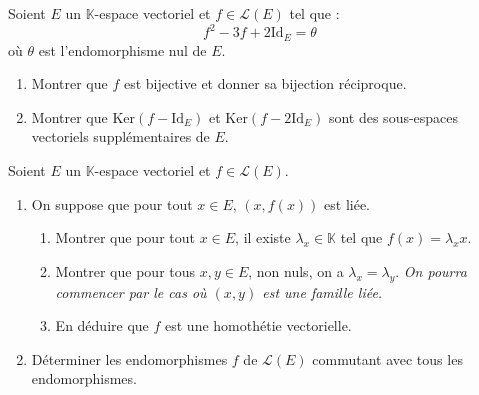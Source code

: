 \documentclass[a4paper,10pt]{report}
\begin{document}
\begin{Exercice}{} Soient $E$ un $\mathbb{K}$-espace vectoriel et $f \in \mathcal{L}(E)$ tel que :
    \[
    f^2 - 3f + 2 \textrm{Id}_E = \theta
    \]
où $\theta$ est l'endomorphisme nul de $E$.
    \begin{enumerate}
      \item Montrer que $f$ est bijective et donner sa bijection réciproque.
      \item Montrer que $\textrm{Ker}(f - \textrm{Id}_E)$ et $\textrm{Ker}(f - 2\textrm{Id}_E)$ sont des sous-espaces vectoriels supplémentaires de $E$.
    \end{enumerate}
\end{Exercice}



\begin{Exercice}{} Soient $E$ un $\mathbb{K}$-espace vectoriel et $f \in \mathcal{L}(E)$.

\begin{enumerate}
\item On suppose que pour tout $x \in E$, $(x, f(x))$ est liée.
\begin{enumerate}
\item Montrer que pour tout $x \in E$, il existe $\lambda_x \in \mathbb{K}$ tel que $f(x)= \lambda_x x$.
\item Montrer que pour tous $x,y \in E$, non nuls, on a $\lambda_x = \lambda_y$. \textit{On pourra commencer par le cas où $(x,y)$ est une famille liée.}
\item En déduire que $f$ est une homothétie vectorielle.
\end{enumerate}
\item Déterminer les endomorphismes $f$ de $\mathcal{L}(E)$ commutant avec tous les endomorphismes.
\end{enumerate}
\end{Exercice} 








%
%
%
%
%
%
%
%
\end{document}
